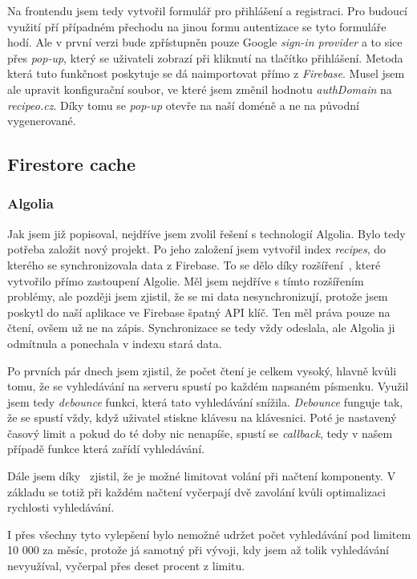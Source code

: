 Na frontendu jsem tedy vytvořil formulář pro přihlášení a registraci. Pro budoucí využití pří případném přechodu na jinou formu
autentizace se tyto formuláře hodí. Ale v první verzi bude zpřístupněn pouze Google \emph{sign-in provider} a to sice přes \emph{pop-up},
který se uživateli zobrazí při kliknutí na tlačítko přihlášení. Metoda která tuto funkčnost poskytuje se dá naimportovat přímo
z \emph{Firebase}. Musel jsem ale upravit konfigurační soubor, ve které jsem změnil hodnotu \emph{authDomain} na \emph{recipeo.cz}.
Díky tomu se \emph{pop-up} otevře na naší doméně a ne na původní vygenerované.

\subsection{Firestore cache}
\subsubsection{Algolia}
Jak jsem již popisoval, nejdříve jsem zvolil řešení s technologií Algolia. Bylo tedy potřeba založit nový projekt. Po jeho založení
jsem vytvořil index \emph{recipes}, do kterého se synchronizovala data z Firebase. To se dělo díky rozšíření~\cite{AlgoliaExtension}, které vytvořilo přímo
zastoupení Algolie. Měl jsem nejdříve s tímto rozšířením problémy, ale později jsem zjistil, že se mi data nesynchronizují, protože jsem
poskytl do naší aplikace ve Firebase špatný API klíč. Ten měl práva pouze na čtení, ovšem už ne na zápis. Synchronizace se tedy vždy odeslala,
ale Algolia ji odmítnula a ponechala v indexu stará data.

Po prvních pár dnech jsem zjistil, že počet čtení je celkem vysoký, hlavně kvůli tomu, že se vyhledávání na serveru spustí po
každém napsaném písmenku. Využil jsem tedy \emph{debounce} funkci, která tato vyhledávání snížila. \emph{Debounce} funguje tak,
že se spustí vždy, když uživatel stiskne klávesu na klávesnici. Poté je nastavený časový limit a pokud do té doby nic nenapíše,
spustí se \emph{callback}, tedy v našem případě funkce která zařídí vyhledávání.

Dále jsem díky~\cite{AlgoliaBlog} zjistil, že je možné limitovat volání při načtení komponenty. V základu se totiž při každém
načtení vyčerpají dvě zavolání kvůli optimalizaci rychlosti vyhledávání.

I přes všechny tyto vylepšení bylo nemožné udržet počet vyhledávání pod limitem 10 000 za měsíc, protože já samotný při vývoji,
kdy jsem až tolik vyhledávání nevyužíval, vyčerpal přes deset procent z limitu.

